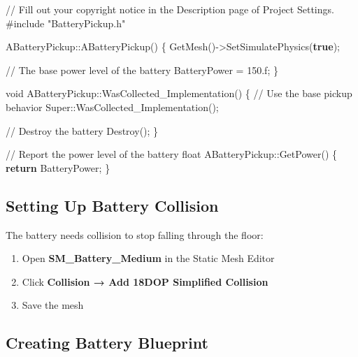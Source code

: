 \documentclass[
  letterpaper,
  DIV=11,
  numbers=noendperiod]{scrartcl}
\newenvironment{Shaded}{\begin{snugshade}}{\end{snugshade}}
\newcommand{\BuiltInTok}[1]{\textcolor[rgb]{0.00,0.23,0.31}{#1}}
\newcommand{\CommentTok}[1]{\textcolor[rgb]{0.37,0.37,0.37}{#1}}
\newcommand{\ControlFlowTok}[1]{\textcolor[rgb]{0.00,0.23,0.31}{\textbf{#1}}}
\newcommand{\DataTypeTok}[1]{\textcolor[rgb]{0.68,0.00,0.00}{#1}}
\newcommand{\FloatTok}[1]{\textcolor[rgb]{0.68,0.00,0.00}{#1}}
\newcommand{\ImportTok}[1]{\textcolor[rgb]{0.00,0.46,0.62}{#1}}
\newcommand{\KeywordTok}[1]{\textcolor[rgb]{0.00,0.23,0.31}{\textbf{#1}}}
\newcommand{\NormalTok}[1]{\textcolor[rgb]{0.00,0.23,0.31}{#1}}
\newcommand{\OperatorTok}[1]{\textcolor[rgb]{0.37,0.37,0.37}{#1}}
\newcommand{\PreprocessorTok}[1]{\textcolor[rgb]{0.68,0.00,0.00}{#1}}
\providecommand{\tightlist}{%
  \setlength{\itemsep}{0pt}\setlength{\parskip}{0pt}}
\begin{document}
\begin{Shaded}
\begin{Highlighting}[]
\CommentTok{// Fill out your copyright notice in the Description page of Project Settings.}
\PreprocessorTok{\#include }\ImportTok{"BatteryPickup.h"}

\NormalTok{ABatteryPickup}\OperatorTok{::}\NormalTok{ABatteryPickup}\OperatorTok{()}
\OperatorTok{\{}
\NormalTok{    GetMesh}\OperatorTok{(){-}\textgreater{}}\NormalTok{SetSimulatePhysics}\OperatorTok{(}\KeywordTok{true}\OperatorTok{);}
    
    \CommentTok{// The base power level of the battery}
\NormalTok{    BatteryPower }\OperatorTok{=} \FloatTok{150.}\BuiltInTok{f}\OperatorTok{;}
\OperatorTok{\}}

\DataTypeTok{void}\NormalTok{ ABatteryPickup}\OperatorTok{::}\NormalTok{WasCollected\_Implementation}\OperatorTok{()}
\OperatorTok{\{}
    \CommentTok{// Use the base pickup behavior}
\NormalTok{    Super}\OperatorTok{::}\NormalTok{WasCollected\_Implementation}\OperatorTok{();}
    
    \CommentTok{// Destroy the battery}
\NormalTok{    Destroy}\OperatorTok{();}
\OperatorTok{\}}

\CommentTok{// Report the power level of the battery}
\DataTypeTok{float}\NormalTok{ ABatteryPickup}\OperatorTok{::}\NormalTok{GetPower}\OperatorTok{()}
\OperatorTok{\{}
    \ControlFlowTok{return}\NormalTok{ BatteryPower}\OperatorTok{;}
\OperatorTok{\}}
\end{Highlighting}
\end{Shaded}

\subsection{Setting Up Battery
Collision}\label{setting-up-battery-collision}

The battery needs collision to stop falling through the floor:

\begin{enumerate}
\def\labelenumi{\arabic{enumi}.}
\tightlist
\item
  Open \textbf{SM\_Battery\_Medium} in the Static Mesh Editor
\item
  Click \textbf{Collision → Add 18DOP Simplified Collision}
\item
  Save the mesh
\end{enumerate}

\subsection{Creating Battery
Blueprint}\label{creating-battery-blueprint}
\end{document}
